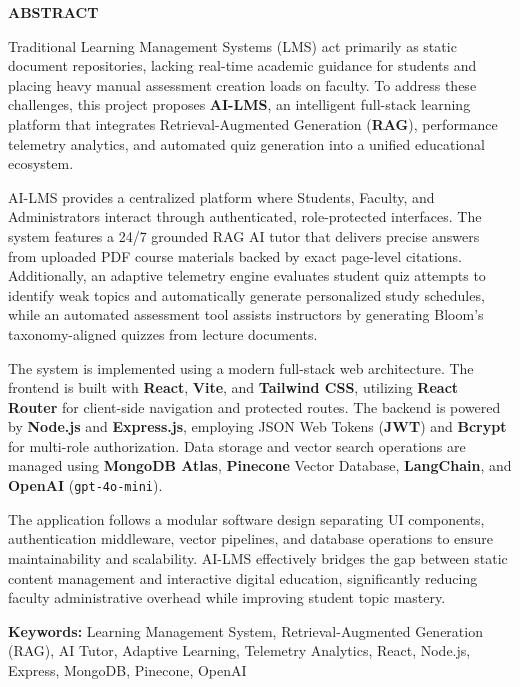 \newpage
\thispagestyle{empty}

\begin{center}
{\Large\textbf{ABSTRACT}}
\end{center}

\vspace{1cm}

Traditional Learning Management Systems (LMS) act primarily as static document repositories, lacking real-time academic guidance for students and placing heavy manual assessment creation loads on faculty. To address these challenges, this project proposes \textbf{AI-LMS}, an intelligent full-stack learning platform that integrates Retrieval-Augmented Generation (\textbf{RAG}), performance telemetry analytics, and automated quiz generation into a unified educational ecosystem.

AI-LMS provides a centralized platform where Students, Faculty, and Administrators interact through authenticated, role-protected interfaces. The system features a 24/7 grounded RAG AI tutor that delivers precise answers from uploaded PDF course materials backed by exact page-level citations. Additionally, an adaptive telemetry engine evaluates student quiz attempts to identify weak topics and automatically generate personalized study schedules, while an automated assessment tool assists instructors by generating Bloom's taxonomy-aligned quizzes from lecture documents.

The system is implemented using a modern full-stack web architecture. The frontend is built with \textbf{React}, \textbf{Vite}, and \textbf{Tailwind CSS}, utilizing \textbf{React Router} for client-side navigation and protected routes. The backend is powered by \textbf{Node.js} and \textbf{Express.js}, employing JSON Web Tokens (\textbf{JWT}) and \textbf{Bcrypt} for multi-role authorization. Data storage and vector search operations are managed using \textbf{MongoDB Atlas}, \textbf{Pinecone} Vector Database, \textbf{LangChain}, and \textbf{OpenAI} (\texttt{gpt-4o-mini}).

The application follows a modular software design separating UI components, authentication middleware, vector pipelines, and database operations to ensure maintainability and scalability. AI-LMS effectively bridges the gap between static content management and interactive digital education, significantly reducing faculty administrative overhead while improving student topic mastery.

\vfill

\noindent
\textbf{Keywords:} Learning Management System, Retrieval-Augmented Generation (RAG), AI Tutor, Adaptive Learning, Telemetry Analytics, React, Node.js, Express, MongoDB, Pinecone, OpenAI
